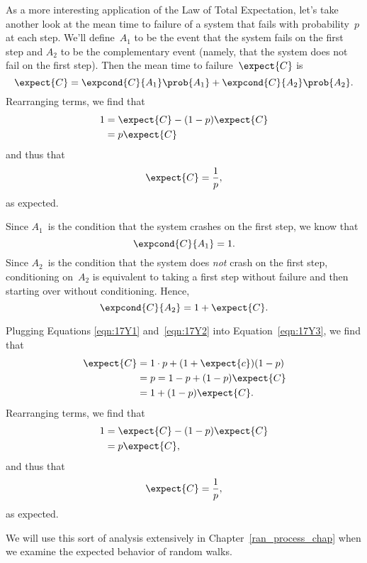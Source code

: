 As a more interesting application of the Law of Total Expectation,
let's take another look at the mean time to failure of a system that
fails with probability~$p$ at each step.  We'll define~$A_1$ to be the
event that the system fails on the first step and $A_2$ to be the
complementary event (namely, that the system does not fail on the
first step).  Then the mean time to failure~$\expect{C}$ is
\begin{equation}\label{eqn:17Y3}
    \expect{C} = \expcond{C}{A_1} \prob{A_1} + \expcond{C}{A_2} \prob{A_2}.
\end{equation}
Rearranging terms, we find that
\begin{align*}
    1 &= \expect{C} - (1 - p) \expect{C} \\
      &= p \expect{C}
\end{align*}
and thus that
\begin{equation*}
    \expect{C} = \frac{1}{p},
\end{equation*}
as expected.

Since $A_1$~is the condition that the system crashes on the first
step, we know that
\begin{equation}\label{eqn:17Y1}
    \expcond{C}{A_1} = 1.
\end{equation}
Since $A_2$~is the condition that the system does \emph{not} crash on
the first step, conditioning on~$A_2$ is equivalent to taking a first
step without failure and then starting over without conditioning.
Hence,
\begin{equation}\label{eqn:17Y2}
    \expcond{C}{A_2} = 1 + \expect{C}.
\end{equation}

Plugging Equations \ref{eqn:17Y1} and~\ref{eqn:17Y2} into
Equation~\ref{eqn:17Y3}, we find that
\begin{align*}
\expect{C}
    &= 1 \cdot p + (1 + \expect{c}) (1 - p) \\
    &= p = 1 - p + (1 - p) \expect{C} \\
    &= 1 + (1 - p) \expect{C}.
\end{align*}
Rearranging terms, we find that
\begin{align*}
    1   &= \expect{C} - (1 - p) \expect{C} \\
        &= p \expect{C},
\end{align*}
and thus that
\begin{equation*}
    \expect{C} = \frac{1}{p},
\end{equation*}
as expected.

We will use this sort of analysis extensively in
Chapter~\ref{ran_process_chap} when we examine the expected behavior
of random walks.

